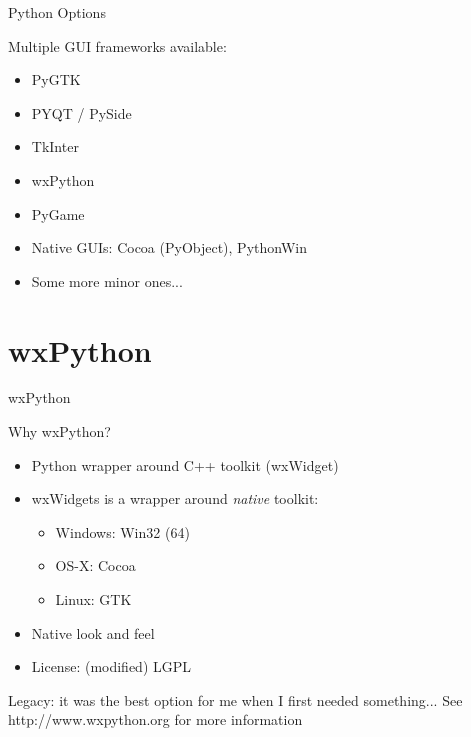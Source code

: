 \documentclass{beamer}
\begin{document}
\begin{frame}[fragile]{Python Options}



{\Large Multiple GUI frameworks available:}

\begin{itemize}
  \item PyGTK
  \item PYQT / PySide
  \item TkInter
  \item wxPython
  \item PyGame
  \item Native GUIs: Cocoa (PyObject), PythonWin
  \item Some more minor ones...
\end{itemize}

\end{frame}

\section{wxPython}

\begin{frame}[fragile]{wxPython}

{\Large Why wxPython?}

\begin{itemize}
  \item Python wrapper around C++ toolkit (wxWidget)
  \item wxWidgets is a wrapper around \emph{native} toolkit:
  \begin{itemize}
    \item Windows: Win32 (64)
    \item OS-X: Cocoa
    \item Linux: GTK
  \end{itemize}
  \item Native look and feel
  \item License: (modified) LGPL
\end{itemize}

\vfill
{\Large Legacy: it was the best option for me when I first needed something...}
See http://www.wxpython.org for more information

\end{frame}
\end{document}
